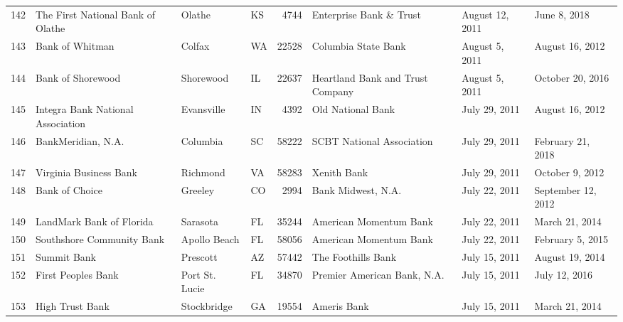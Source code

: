 \begin{tabular}{llllrlll}
142 &                  The First National Bank of Olathe &              Olathe &  KS &   4744 &                            Enterprise Bank \& Trust &     August 12, 2011 &        June 8, 2018 \\
143 &                                    Bank of Whitman &              Colfax &  WA &  22528 &                                Columbia State Bank &      August 5, 2011 &     August 16, 2012 \\
144 &                                  Bank of Shorewood &           Shorewood &  IL &  22637 &                   Heartland Bank and Trust Company &      August 5, 2011 &    October 20, 2016 \\
145 &                  Integra Bank National Association &          Evansville &  IN &   4392 &                                  Old National Bank &       July 29, 2011 &     August 16, 2012 \\
146 &                                 BankMeridian, N.A. &            Columbia &  SC &  58222 &                          SCBT National Association &       July 29, 2011 &   February 21, 2018 \\
147 &                             Virginia Business Bank &            Richmond &  VA &  58283 &                                        Xenith Bank &       July 29, 2011 &     October 9, 2012 \\
148 &                                     Bank of Choice &             Greeley &  CO &   2994 &                                 Bank Midwest, N.A. &       July 22, 2011 &  September 12, 2012 \\
149 &                           LandMark Bank of Florida &            Sarasota &  FL &  35244 &                             American Momentum Bank &       July 22, 2011 &      March 21, 2014 \\
150 &                          Southshore Community Bank &        Apollo Beach &  FL &  58056 &                             American Momentum Bank &       July 22, 2011 &    February 5, 2015 \\
151 &                                        Summit Bank &            Prescott &  AZ &  57442 &                                 The Foothills Bank &       July 15, 2011 &     August 19, 2014 \\
152 &                                 First Peoples Bank &      Port St. Lucie &  FL &  34870 &                        Premier American Bank, N.A. &       July 15, 2011 &       July 12, 2016 \\
153 &                                    High Trust Bank &         Stockbridge &  GA &  19554 &                                        Ameris Bank &       July 15, 2011 &      March 21, 2014 \\

\end{tabular}
